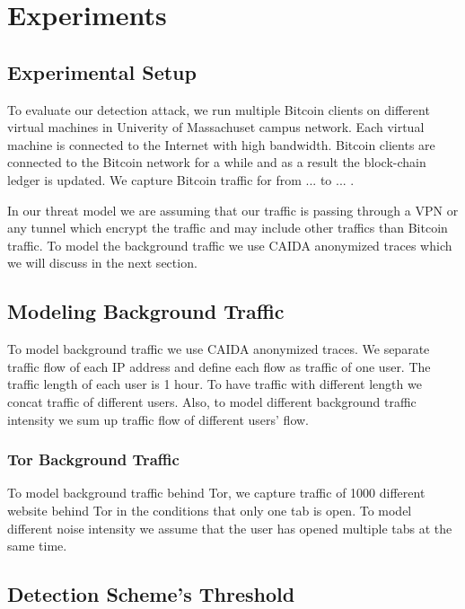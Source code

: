 \section{Experiments}
\subsection{Experimental Setup}
\par To evaluate our detection attack, we run multiple Bitcoin clients on different virtual machines in Univerity of Massachuset campus network. Each virtual machine is connected to the Internet with high bandwidth. Bitcoin clients are connected to the Bitcoin network for a while and as a result the block-chain ledger is updated. We capture Bitcoin traffic for from ... to ... . 
\par In our threat model we are assuming that our traffic is passing through a VPN or any tunnel which encrypt the traffic and may include other traffics than Bitcoin traffic. To model the background traffic we use CAIDA anonymized traces which we will discuss in the next section. 

\subsection{Modeling Background Traffic}
To model background traffic we use CAIDA anonymized traces. We separate traffic flow of each IP address and define each flow as traffic of one user. The traffic length of each user is 1 hour. To have traffic with different length we concat traffic of different users. Also, to model different background traffic intensity we sum up traffic flow of different users' flow. 
\subsubsection{Tor Background Traffic}
\par To model background traffic behind Tor, we capture traffic of 1000 different website behind Tor in the conditions that only one tab is open. To model different noise intensity we assume that the user has opened multiple tabs at the same time. 

\subsection{Detection Scheme's Threshold}


